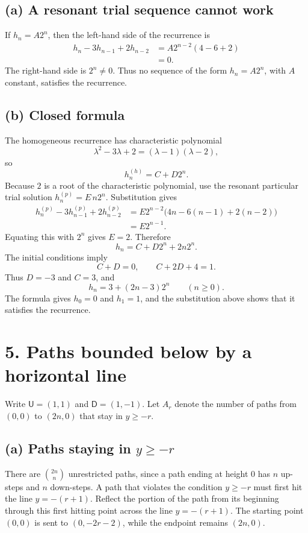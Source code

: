 \documentclass[11pt]{article}
\newcommand{\U}{\mathsf{U}}
\newcommand{\D}{\mathsf{D}}
\begin{document}
\subsection*{(a) A resonant trial sequence cannot work}

If \(h_n=A2^n\), then the left-hand side of the recurrence is
\[
\begin{aligned}
h_n-3h_{n-1}+2h_{n-2}
  &=A2^{n-2}(4-6+2)\\
  &=0.
\end{aligned}
\]
The right-hand side is \(2^n\ne0\). Thus no sequence of the form
\(h_n=A2^n\), with \(A\) constant, satisfies the recurrence.

\subsection*{(b) Closed formula}

The homogeneous recurrence has characteristic polynomial
\[
    \lambda^2-3\lambda+2=(\lambda-1)(\lambda-2),
\]
so
\[
    h_n^{(h)}=C+D2^n.
\]
Because \(2\) is a root of the characteristic polynomial, use the resonant
particular trial solution \(h_n^{(p)}=E\,n2^n\). Substitution gives
\[
\begin{aligned}
h_n^{(p)}-3h_{n-1}^{(p)}+2h_{n-2}^{(p)}
 &=E2^{n-2}\bigl(4n-6(n-1)+2(n-2)\bigr)\\
 &=E2^{n-1}.
\end{aligned}
\]
Equating this with \(2^n\) gives \(E=2\). Therefore
\[
    h_n=C+D2^n+2n2^n.
\]
The initial conditions imply
\[
    C+D=0,\qquad C+2D+4=1.
\]
Thus \(D=-3\) and \(C=3\), and
\[
\boxed{
    h_n=3+(2n-3)2^n\qquad(n\geq0).
}
\]
The formula gives \(h_0=0\) and \(h_1=1\), and the substitution above shows
that it satisfies the recurrence.

\section*{5. Paths bounded below by a horizontal line}

Write \(\U=(1,1)\) and \(\D=(1,-1)\). Let \(A_r\) denote the number of paths
from \((0,0)\) to \((2n,0)\) that stay in \(y\geq-r\).

\subsection*{(a) Paths staying in \(y\geq-r\)}

There are \(\binom{2n}{n}\) unrestricted paths, since a path ending at
height \(0\) has \(n\) up-steps and \(n\) down-steps. A path that violates
the condition \(y\geq-r\) must first hit the line \(y=-(r+1)\). Reflect the
portion of the path from its beginning through this first hitting point
across the line \(y=-(r+1)\). The starting point \((0,0)\) is sent to
\((0,-2r-2)\), while the endpoint remains \((2n,0)\).
\end{document}
